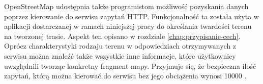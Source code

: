 OpenStreetMap udostępnia także programistom możliwość pozyskania danych poprzez kierowanie do serwisu zapytań HTTP. Funkcjonalność ta została użyta w aplikacji dostarczanej w ramach niniejszej pracy do określania twardości terenu na tworzonej trasie. Aspekt ten opisano w rozdziale \ref{chap:przypisanie-cech}. Oprócz charakterystyki rodzaju terenu w odpowiedziach otrzymywanych z serwisu można znaleźć także wszystkie inne informacje, które użytkownicy uwzględnili tworząc konkretny fragment mapy. Przyjmuje się, że bezpieczna ilość zapytań, którą można kierować do serwisu bez jego obciążenia wynosi 10000 \cite{osm-docs-wiki}.